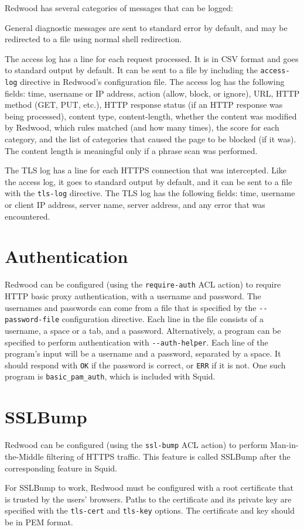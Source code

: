 \documentclass{article}
\begin{document}
Redwood has several categories of messages that can be logged:

General diagnostic messages are sent to standard error by default,
and may be redirected to a file using normal shell redirection.

The access log has a line for each request processed.
It is in CSV format
and goes to standard output by default.
It can be sent to a file by including the \verb"access-log" directive in Redwood's configuration file.
The access log has the following fields: time, username or IP address, 
action (allow, block, or ignore), URL, HTTP method (GET, PUT, etc.),
HTTP response status (if an HTTP response was being processed), 
content type, content-length, whether the content was modified by Redwood, which rules matched (and how many times), 
the score for each category, and the list of categories that caused the page to be blocked (if it was).
The content length is meaningful only if a phrase scan was performed.

The TLS log has a line for each HTTPS connection that was intercepted.
Like the access log, it goes to standard output by default, 
and it can be sent to a file with the \verb"tls-log" directive.
The TLS log has the following fields:
time, username or client IP address, server name, server address, 
and any error that was encountered.

\section{Authentication}

Redwood can be configured (using the \verb"require-auth" ACL action) to require HTTP basic proxy authentication,
with a username and password.
The usernames and passwords can come from a file that is specified by the \verb"--password-file"
configuration directive. Each line in the file consists of a username,
a space or a tab, and a password.
Alternatively, a program can be specified to perform authentication with \verb"--auth-helper".
Each line of the program's input will be a username and a password, separated by a space.
It should respond with \verb"OK" if the password is correct, or \verb"ERR" if it is not.
One such program is \verb"basic_pam_auth", which is included with Squid.

\section{SSLBump}

Redwood can be configured (using the \verb"ssl-bump" ACL action) to perform Man-in-the-Middle filtering of HTTPS traffic.
This feature is called SSLBump after the corresponding feature in Squid.

For SSLBump to work, Redwood must be configured with a root certificate that is trusted
by the users' browsers.
Paths to the certificate and its private key are specified with the \verb"tls-cert" and \verb"tls-key"
options.
The certificate and key should be in PEM format.
\end{document}
